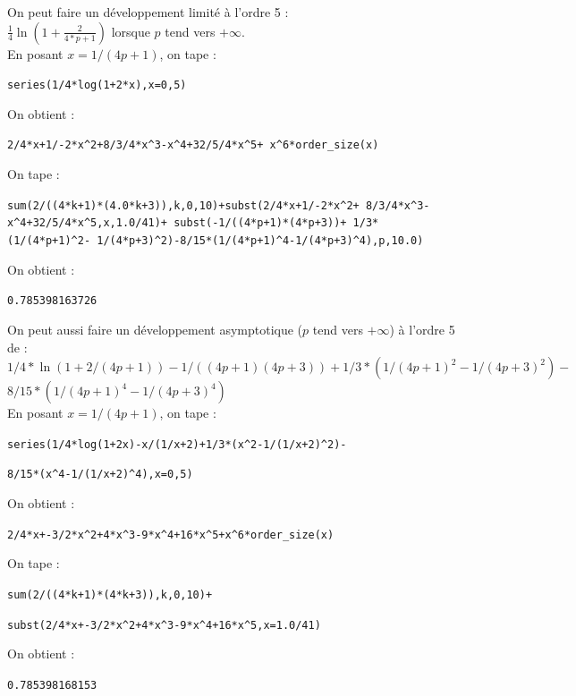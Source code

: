 \documentclass[a4paper,11pt]{book}
\begin{document}
On peut faire un d\'eveloppement limit\'e \`a l'ordre 5 :\\ 
$\frac{1}{4}\ln(1+\frac{2}{4*p+1})$ lorsque $p$ tend vers $+\infty$.\\
En posant  $x=1/(4p+1)$, on tape :
\begin{center}{\tt series(1/4*log(1+2*x),x=0,5)}\end{center}
On obtient :
\begin{center}{\tt 2/4*x+1/-2*x\verb|^|2+8/3/4*x\verb|^|3-x\verb|^|4+32/5/4*x\verb|^|5+ x\verb|^|6*order\_size(x)}\end{center}
On tape :
\begin{center}{\tt sum(2/((4*k+1)*(4.0*k+3)),k,0,10)+subst(2/4*x+1/-2*x\verb|^|2+ 8/3/4*x\verb|^|3-x\verb|^|4+32/5/4*x\verb|^|5,x,1.0/41)+ subst(-1/((4*p+1)*(4*p+3))+ 1/3*(1/(4*p+1)\verb|^|2- 1/(4*p+3)\verb|^|2)-8/15*(1/(4*p+1)\verb|^|4-1/(4*p+3)\verb|^|4),p,10.0)}\end{center}
On obtient :\begin{center}{\tt 0.785398163726}\end{center}
On peut aussi faire un d\'eveloppement asymptotique ($p$ tend vers $+\infty$) \`a l'ordre 5 de :\\
$1/4*\ln(1+2/(4p+1))-1/((4p+1)(4p+3))+1/3*(1/(4p+1)^2-1/(4p+3)^2)-$\\
$8/15*(1/(4p+1)^4-1/(4p+3)^4)$\\
En posant  $x=1/(4p+1)$, on tape :
\begin{center}{\tt series(1/4*log(1+2x)-x/(1/x+2)+1/3*(x\verb|^|2-1/(1/x+2)\verb|^|2)-}\end{center}
\begin{center}{\tt 8/15*(x\verb|^|4-1/(1/x+2)\verb|^|4),x=0,5)}\end{center}
On obtient :\begin{center}{\tt 2/4*x+-3/2*x\verb|^|2+4*x\verb|^|3-9*x\verb|^|4+16*x\verb|^|5+x\verb|^|6*order\_size(x)}\end{center}
On tape :
\begin{center}{\tt sum(2/((4*k+1)*(4*k+3)),k,0,10)+}\end{center}
\begin{center}{\tt subst(2/4*x+-3/2*x\verb|^|2+4*x\verb|^|3-9*x\verb|^|4+16*x\verb|^|5,x=1.0/41)}\end{center}
On obtient :\begin{center}{\tt 0.785398168153}\end{center}
\end{document}
